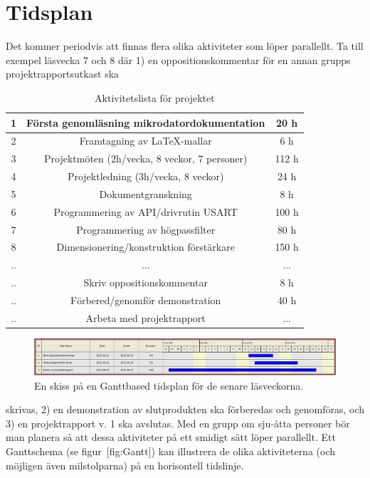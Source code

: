 \documentclass[a4paper]{article}
\begin{document}
\section {Tidsplan}


Det kommer periodvis att finnas flera olika aktiviteter som löper
parallellt. Ta till exempel läsvecka 7 och 8 där 1) en
oppositionskommentar för en annan grupps projektrapportsutkast ska

\begin{table} [h]
\begin{center}
\begin{tabular}{ |c|c|c| } 
 \hline
 1 & Första genomläsning mikrodatordokumentation & 20 h\\ 
 \hline
 2 & Framtagning av LaTeX-mallar & 6 h \\ 
 \hline
 3 & Projektmöten (2h/vecka, 8 veckor, 7 personer)  & 112 h \\ 
 \hline
 4 & Projektledning (3h/vecka, 8 veckor) & 24 h \\ 
 \hline
 5 & Dokumentgranskning & 8 h \\
 \hline
 6 & Programmering av API/drivrutin USART & 100 h\\ 
 \hline
 7 & Programmering av högpassfilter & 80 h \\ 
 \hline
 8 & Dimensionering/konstruktion förstärkare & 150 h \\ 
 \hline
 .. & ... & ... \\ 
 \hline
 .. & Skriv oppositionskommentar & 8 h \\ 
 \hline
 .. & Förbered/genomför demonstration & 40 h \\
 \hline
 .. & Arbeta med projektrapport & ... \\ 
 \hline
\end{tabular}
\end{center}
\caption{Aktivitetslista för projektet}
\end{table}

\begin{figure}[h]
    \centering
    \includegraphics[width=\textwidth]{tidsplan.pdf}
    \caption{En skiss på en Ganttbased tidsplan för de senare läsveckorna.}
    \label{fig:my_label}
\end{figure}

skrivas, 2) en demonstration av slutprodukten ska förberedas och
genomföras, och 3) en projektrapport v. 1 ska avslutas. Med en grupp om
sju-åtta personer bör man planera så att dessa aktiviteter på ett
smidigt sätt löper parallellt. Ett Ganttschema (se figur [fig:Gantt])
kan illustrera de olika aktiviteterna (och möjligen även milstolparna)
på en horisontell tidslinje.
\end{document}
